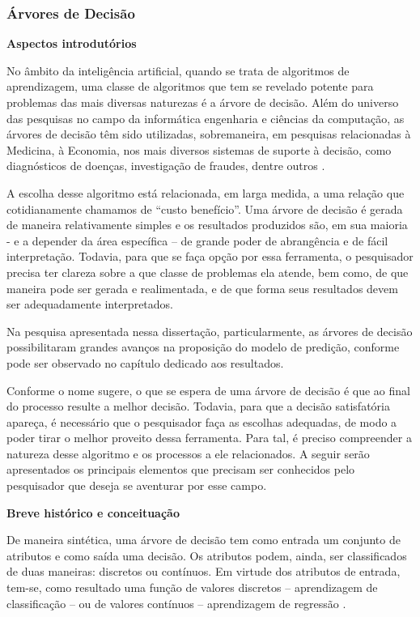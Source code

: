 \subsubsection{Árvores de Decisão}

\textbf{Aspectos introdutórios}
\vspace{5mm}

No âmbito da inteligência artificial, quando se trata de algoritmos de aprendizagem, uma classe de algoritmos que tem se revelado potente para problemas das mais diversas naturezas é a árvore de decisão. Além do universo das pesquisas no campo da informática engenharia e ciências da computação, as árvores de decisão têm sido utilizadas, sobremaneira, em pesquisas relacionadas à Medicina, à Economia, nos mais diversos sistemas de suporte à decisão, como diagnósticos de doenças, investigação de fraudes, dentre outros \cite{Camilo}.

A escolha desse algoritmo está relacionada, em larga medida, a uma relação que cotidianamente chamamos de “custo benefício”. Uma árvore de decisão é gerada de maneira relativamente simples e os resultados produzidos são, em sua maioria - e a depender da área específica – de grande poder de abrangência e de fácil interpretação. Todavia, para que se faça opção por essa ferramenta, o pesquisador precisa ter clareza sobre a que classe de problemas ela atende, bem como, de que maneira pode ser gerada e realimentada, e de que forma seus resultados devem ser adequadamente interpretados.

Na pesquisa apresentada nessa dissertação, particularmente, as árvores de decisão possibilitaram grandes avanços na proposição do modelo de predição, conforme pode ser observado no capítulo dedicado aos resultados. 

Conforme o nome sugere, o que se espera de uma árvore de decisão é que ao final do processo resulte a melhor decisão. Todavia, para que a decisão satisfatória apareça, é necessário que o pesquisador faça as escolhas adequadas, de modo a poder tirar o melhor proveito dessa ferramenta. Para tal, é preciso compreender a natureza desse algoritmo e os processos a ele relacionados. A seguir serão apresentados os principais elementos que precisam ser conhecidos pelo pesquisador que deseja se aventurar por esse campo.

\vspace{5mm}
\textbf{Breve histórico e conceituação}
\vspace{5mm}

De maneira sintética, uma árvore de decisão tem como entrada um conjunto de atributos e como saída uma decisão. Os atributos podem, ainda, ser classificados de duas maneiras: discretos ou contínuos. Em virtude dos atributos de entrada, tem-se, como resultado uma função de valores discretos – aprendizagem de classificação – ou de valores contínuos – aprendizagem de regressão \cite{NorvigRussel2004}.

